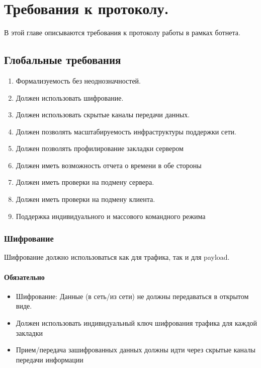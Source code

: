 \section{Требования к протоколу.}

В этой главе описываются требования к протоколу работы в рамках ботнета.

\subsection{Глобальные требования}
\begin{enumerate}
\item{Формализуемость без неоднозначностей.}
\item{Должен использовать шифрование.}
\item{Должен использовать скрытые каналы передачи данных.}
\item{Должен позволять масштабируемость инфраструктуры поддержки сети.}
\item{Должен позволять профилирование закладки сервером}
\item{Должен иметь возможность отчета о времени в обе стороны}
\item{Должен иметь проверки на подмену сервера.}
\item{Должен иметь проверки на подмену клиента.}
\item{Поддержка индивидуального и массового командного режима}
\end{enumerate}

\subsubsection{Шифрование}

Шифрование должно использоваться как для трафика, так и для payload.

\paragraph{Обязательно\\}

\begin{itemize}
\item{Шифрование: Данные (в сеть/из сети) не должны передаваться в открытом виде.}
\item{Должен использовать индивидуальный ключ шифрования трафика для каждой закладки}
\item{Прием/передача зашифрованных данных должны идти через скрытые каналы передачи информации}
\end{itemize}

